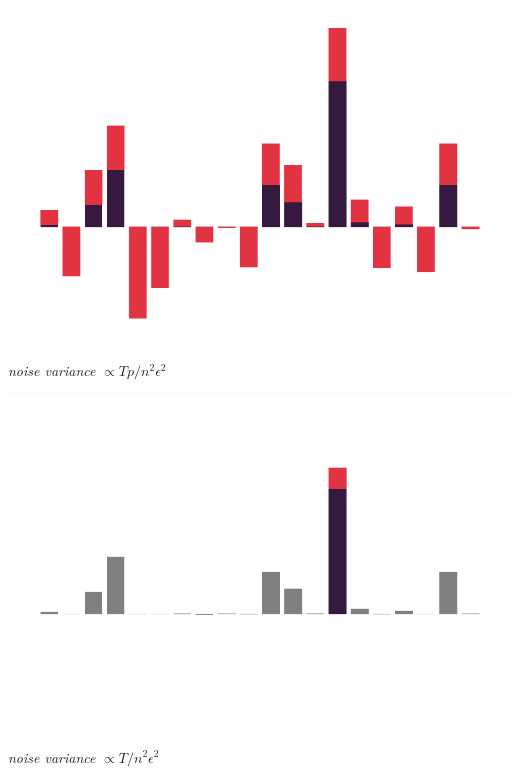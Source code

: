 \documentclass{beamer}
\begin{document}
\begin{frame}
  \vspace{1em}

  \includegraphics[width=\textwidth]{grad_example_2.pdf}

  \vspace{-1.5em}

  \begin{center}
    \Huge \emph{noise variance} $\propto Tp/n^2\epsilon^2$
  \end{center}
  \addtocounter{framenumber}{-1}
\end{frame}

\begin{frame}
  \vspace{1em}

  \includegraphics[width=\textwidth]{grad_example_3.pdf}

  \vspace{-1.5em}

  \begin{center}
    \Huge \emph{noise variance} $\propto T/n^2\epsilon^2$
  \end{center}
  \addtocounter{framenumber}{-1}
\end{frame}
\end{document}
